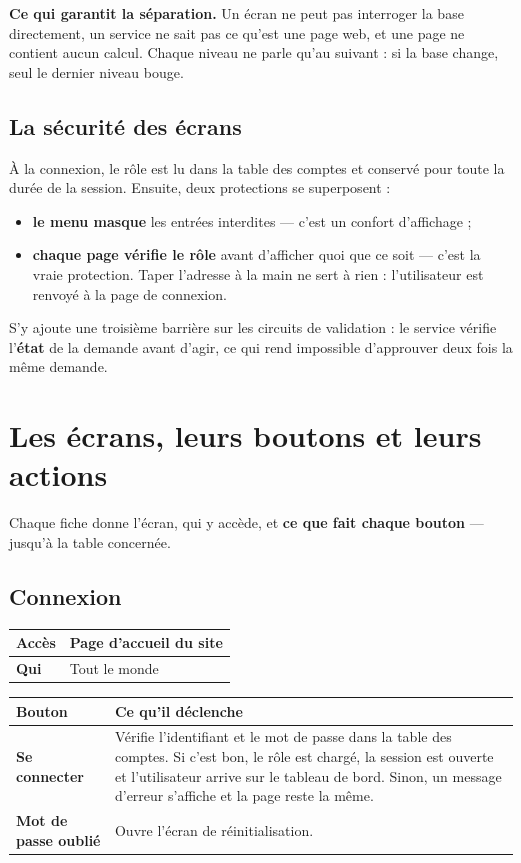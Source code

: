 \documentclass[a4paper,11pt]{article}
\newcommand{\ecran}[3]{%
  \subsection{#1}%
  \noindent\begin{tabularx}{\textwidth}{|>{\columncolor{btkpale}\bfseries}L{2.3cm}|X|}
  \hline
  \textbf{Accès} & #2\\
  \hline
  \textbf{Qui} & #3\\
  \hline
  \end{tabularx}\par\vspace{0.4em}}
\begin{document}
\begin{retenir}
\textbf{Ce qui garantit la séparation.} Un écran ne peut pas interroger la base
directement, un service ne sait pas ce qu'est une page web, et une page ne
contient aucun calcul. Chaque niveau ne parle qu'au suivant : si la base change,
seul le dernier niveau bouge.
\end{retenir}

\subsection{La sécurité des écrans}

À la connexion, le rôle est lu dans la table des comptes et conservé pour toute
la durée de la session. Ensuite, deux protections se superposent :

\begin{itemize}[leftmargin=*,itemsep=2pt]
  \item \textbf{le menu masque} les entrées interdites --- c'est un confort
        d'affichage ;
  \item \textbf{chaque page vérifie le rôle} avant d'afficher quoi que ce soit
        --- c'est la vraie protection. Taper l'adresse à la main ne sert à rien :
        l'utilisateur est renvoyé à la page de connexion.
\end{itemize}

S'y ajoute une troisième barrière sur les circuits de validation : le service
vérifie l'\textbf{état} de la demande avant d'agir, ce qui rend impossible
d'approuver deux fois la même demande.

\section{Les écrans, leurs boutons et leurs actions}

Chaque fiche donne l'écran, qui y accède, et \textbf{ce que fait chaque bouton}
--- jusqu'à la table concernée.

\ecran{Connexion}{Page d'accueil du site}{Tout le monde}

\noindent\begin{tabularx}{\textwidth}{|>{\bfseries}L{4.4cm}|X|}
\hline
\textmd{\textbf{Bouton}} & \textbf{Ce qu'il déclenche}\\
\hline
Se connecter & Vérifie l'identifiant et le mot de passe dans la table des comptes. Si c'est bon, le rôle est chargé, la session est ouverte et l'utilisateur arrive sur le tableau de bord. Sinon, un message d'erreur s'affiche et la page reste la même.\\
\hline
Mot de passe oublié & Ouvre l'écran de réinitialisation.\\
\hline
\end{tabularx}
\end{document}
